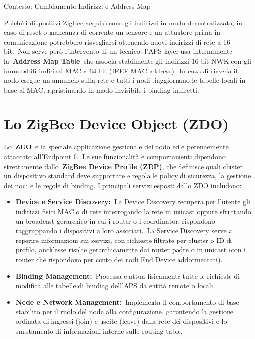 \documentclass[
  italian,
  openany]{book}
\begin{document}
\begin{calloutnote}{Contesto: Cambiamento Indirizzi e Address Map }

Poiché i dispositivi ZigBee acquisiscono gli indirizzi in modo
decentralizzato, in caso di reset o mancanza di corrente un sensore e un
attuatore prima in comunicazione potrebbero risvegliarsi ottenendo nuovi
indirizzi di rete a 16 bit.~Non serve però l'intervento di un tecnico:
l'APS layer usa internamente la~\textbf{Address Map Table}~che associa
stabilmente gli indirizzi 16 bit NWK con gli immutabili indirizzi MAC a
64 bit (IEEE MAC address).~In caso di riavvio il nodo esegue un annuncio
sulla rete e tutti i nodi riaggiornano le tabelle locali in base ai MAC,
ripristinando in modo invisibile i binding indiretti.

\end{calloutnote}

\section{Lo ZigBee Device Object
(ZDO)}\label{lo-zigbee-device-object-zdo}

Lo~\textbf{ZDO}~è la speciale applicazione gestionale del nodo ed è
perennemente attaccato all'Endpoint 0.~Le sue funzionalità e
comportamenti dipendono strettamente dallo~\textbf{ZigBee Device Profile
(ZDP)}, che definisce quali cluster un dispositivo standard deve
supportare e regola le policy di sicurezza, la gestione dei nodi e le
regole di binding. I principali servizi esposti dallo ZDO includono:

\begin{itemize}
\item
  \textbf{Device e Service Discovery:}~La Device Discovery recupera per
  l'utente gli indirizzi fisici MAC o di rete interrogando la rete in
  unicast oppure sfruttando un broadcast gerarchico in cui i router o i
  coordinatori rispondono raggruppando i dispositivi a loro
  associati.~La Service Discovery serve a reperire informazioni sui
  servizi, con richieste filtrate per cluster o ID di profilo, anch'esse
  risolte gerarchicamente dai router padre o in unicast (con i router
  che rispondono per conto dei nodi End Device addormentati).
\item
  \textbf{Binding Management:}~Processa e attua fisicamente tutte le
  richieste di modifica alle tabelle di binding dell'APS da entità
  remote o locali.
\item
  \textbf{Node e Network Management:}~Implementa il comportamento di
  base stabilito per il ruolo del nodo alla configurazione, garantendo
  la gestione ordinata di ingressi (join) e uscite (leave) dalla rete
  dei dispositivi e lo smistamento di informazioni interne sulle routing
  table.
\end{itemize}
\end{document}
